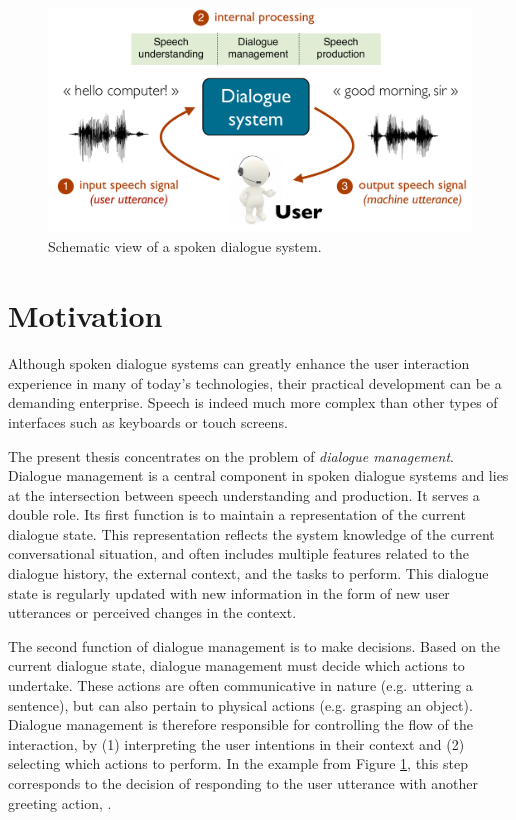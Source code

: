 \begin{figure}[h]
\center
\includegraphics[scale=0.46]{imgs/basicsds.pdf}
\caption{Schematic view of a spoken dialogue system.}
\label{fig:basicsds}
\end{figure}

\section{Motivation}

Although spoken dialogue systems can greatly enhance the user interaction experience in many of today's technologies, their practical development can be a demanding enterprise. Speech is indeed much more complex than other types of interfaces such as keyboards or touch screens.  

The present thesis concentrates on the problem of \textit{dialogue management}.  Dialogue management is a central component in spoken dialogue systems and lies at the intersection between speech understanding and production.  It serves a double role. Its first function is to maintain a representation of the current dialogue state. This representation reflects the system knowledge of the current conversational situation, and often includes multiple features related to the dialogue history, the external context, and the tasks to perform.  This dialogue state is regularly updated with new information in the form of new user utterances or perceived changes in the context. 

The second function of dialogue management is to make decisions.  Based on the current dialogue state, dialogue management must decide which actions to undertake. These actions are often communicative in nature (e.g. uttering a sentence), but can also pertain to physical actions (e.g. grasping an object).  Dialogue management is therefore responsible for controlling the flow of the interaction, by (1) interpreting the user intentions in their context and (2) selecting which actions to perform. In the example from Figure \ref{fig:basicsds}, this step corresponds to the decision of responding to the user utterance  with another greeting action, . 

